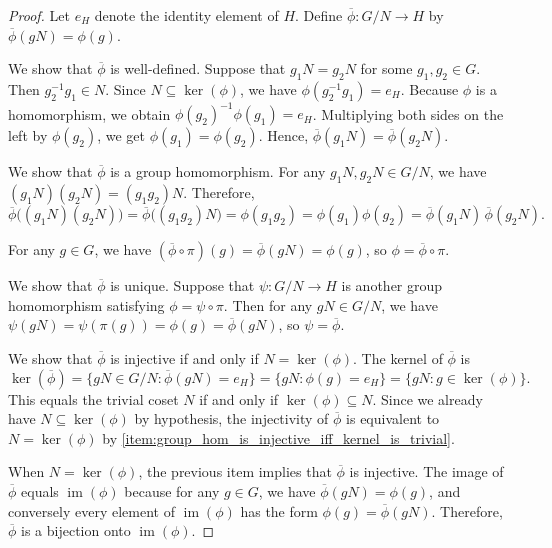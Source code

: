 \begin{proof}
    Let $e_H$ denote the identity element of $H$. Define $\overline{\phi} : G/\!N \to H$ by $\overline{\phi}(gN) = \phi(g)$.

    We show that $\overline{\phi}$ is well-defined. Suppose that $g_1 N = g_2 N$ for some $g_1, g_2 \in G$. Then $g_2^{-1} g_1 \in N$. Since $N \subseteq \operatorname{ker}(\phi)$, we have $\phi(g_2^{-1} g_1) = e_H$. Because $\phi$ is a homomorphism, we obtain $\phi(g_2)^{-1} \phi(g_1) = e_H$. Multiplying both sides on the left by $\phi(g_2)$, we get $\phi(g_1) = \phi(g_2)$. Hence, $\overline{\phi}(g_1 N) = \overline{\phi}(g_2 N)$.

    We show that $\overline{\phi}$ is a group homomorphism. For any $g_1 N, g_2 N \in G/\!N$, we have $(g_1 N)(g_2 N) = (g_1 g_2)N$. Therefore,
    $$\overline{\phi}\bigl((g_1 N)(g_2 N)\bigr) = \overline{\phi}\bigl((g_1 g_2)N\bigr) = \phi(g_1 g_2) = \phi(g_1)\phi(g_2) = \overline{\phi}(g_1 N)\,\overline{\phi}(g_2 N).$$

    For any $g \in G$, we have $(\overline{\phi} \circ \pi)(g) = \overline{\phi}(gN) = \phi(g)$, so $\phi = \overline{\phi} \circ \pi$.

    We show that $\overline{\phi}$ is unique. Suppose that $\psi : G/\!N \to H$ is another group homomorphism satisfying $\phi = \psi \circ \pi$. Then for any $gN \in G/\!N$, we have $\psi(gN) = \psi(\pi(g)) = \phi(g) = \overline{\phi}(gN)$, so $\psi = \overline{\phi}$.

    We show that $\overline{\phi}$ is injective if and only if $N = \ker(\phi)$. The kernel of $\overline{\phi}$ is
    $$\operatorname{ker}(\overline{\phi}) = \{ gN \in G/\!N : \overline{\phi}(gN) = e_H \} = \{ gN : \phi(g) = e_H \} = \{ gN : g \in \operatorname{ker}(\phi) \}.$$
    This equals the trivial coset $N$ if and only if $\operatorname{ker}(\phi) \subseteq N$. Since we already have $N \subseteq \operatorname{ker}(\phi)$ by hypothesis, the injectivity of $\overline{\phi}$ is equivalent to $N = \operatorname{ker}(\phi)$ by \eqref{item:group_hom_is_injective_iff_kernel_is_trivial}.

    When $N = \operatorname{ker}(\phi)$, the previous item implies that $\overline{\phi}$ is injective. The image of $\overline{\phi}$ equals $\operatorname{im}(\phi)$ because for any $g \in G$, we have $\overline{\phi}(gN) = \phi(g)$, and conversely every element of $\operatorname{im}(\phi)$ has the form $\phi(g) = \overline{\phi}(gN)$. Therefore, $\overline{\phi}$ is a bijection onto $\operatorname{im}(\phi)$.
\end{proof}

